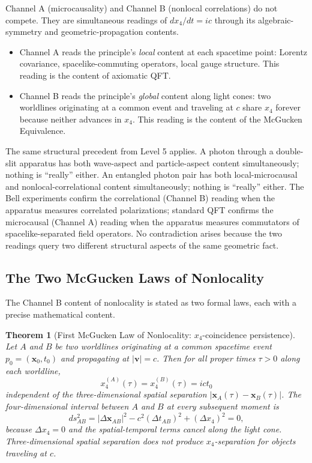 \documentclass[11pt,a4paper]{article}
\newtheorem{theorem}{Theorem}
\begin{document}
Channel A (microcausality) and Channel B (nonlocal correlations) do not compete. They are simultaneous readings of $dx_4/dt = ic$ through its algebraic-symmetry and geometric-propagation contents.

\begin{itemize}
\item Channel A reads the principle's \emph{local} content at each spacetime point: Lorentz covariance, spacelike-commuting operators, local gauge structure. This reading is the content of axiomatic QFT.
\item Channel B reads the principle's \emph{global} content along light cones: two worldlines originating at a common event and traveling at $c$ share $x_4$ forever because neither advances in $x_4$. This reading is the content of the McGucken Equivalence.
\end{itemize}

The same structural precedent from Level 5 applies. A photon through a double-slit apparatus has both wave-aspect and particle-aspect content simultaneously; nothing is ``really'' either. An entangled photon pair has both local-microcausal and nonlocal-correlational content simultaneously; nothing is ``really'' either. The Bell experiments confirm the correlational (Channel B) reading when the apparatus measures correlated polarizations; standard QFT confirms the microcausal (Channel A) reading when the apparatus measures commutators of spacelike-separated field operators. No contradiction arises because the two readings query two different structural aspects of the same geometric fact.

\subsection{The Two McGucken Laws of Nonlocality}

The Channel B content of nonlocality is stated as two formal laws, each with a precise mathematical content.

\begin{theorem}[First McGucken Law of Nonlocality: $x_4$-coincidence persistence]
\label{law:first}
Let $A$ and $B$ be two worldlines originating at a common spacetime event $p_0 = (\mathbf{x}_0, t_0)$ and propagating at $|\mathbf{v}| = c$. Then for all proper times $\tau > 0$ along each worldline,
\begin{equation}
\boxed{x_4^{(A)}(\tau) = x_4^{(B)}(\tau) = ict_0}
\label{eq:firstlaw}
\end{equation}
independent of the three-dimensional spatial separation $|\mathbf{x}_A(\tau) - \mathbf{x}_B(\tau)|$. The four-dimensional interval between $A$ and $B$ at every subsequent moment is
\begin{equation}
ds_{AB}^2 = |\Delta \mathbf{x}_{AB}|^2 - c^2 (\Delta t_{AB})^2 + (\Delta x_4)^2 = 0,
\end{equation}
because $\Delta x_4 = 0$ and the spatial-temporal terms cancel along the light cone. Three-dimensional spatial separation does not produce $x_4$-separation for objects traveling at $c$.
\end{theorem}
\end{document}
